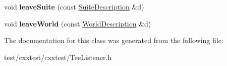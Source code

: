 \begin{DoxyCompactItemize}
\item 
\hypertarget{classCxxTest_1_1TeeListener_aab9624116110d6467880ccbcbe10d88b}{void {\bfseries leave\-Suite} (const \hyperlink{classCxxTest_1_1SuiteDescription}{Suite\-Description} \&d)}\label{classCxxTest_1_1TeeListener_aab9624116110d6467880ccbcbe10d88b}

\item 
\hypertarget{classCxxTest_1_1TeeListener_ac7902d501dac45dd267a43f0526c55cc}{void {\bfseries leave\-World} (const \hyperlink{classCxxTest_1_1WorldDescription}{World\-Description} \&d)}\label{classCxxTest_1_1TeeListener_ac7902d501dac45dd267a43f0526c55cc}

\end{DoxyCompactItemize}


The documentation for this class was generated from the following file\-:\begin{DoxyCompactItemize}
\item 
test/cxxtest/cxxtest/Tee\-Listener.\-h\end{DoxyCompactItemize}
